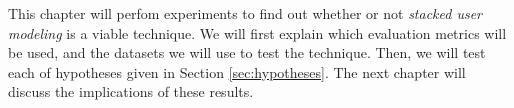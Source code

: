 \label{chap:results}

This chapter will perfom experiments to find out whether or not
\emph{stacked user modeling} is a viable technique.
We will first explain which evaluation metrics will be used,
and the datasets we will use to test the technique.
Then, we will test each of hypotheses given in Section \ref{sec:hypotheses}.
The next chapter will discuss the implications of these results.









